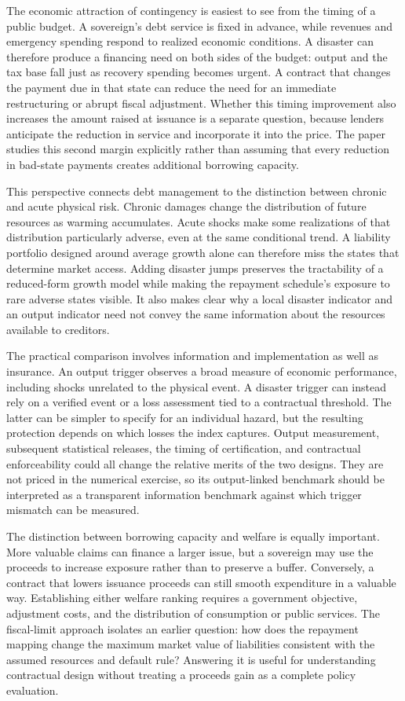 The economic attraction of contingency is easiest to see from the timing of a public budget. A sovereign's debt service is fixed in advance, while revenues and emergency spending respond to realized economic conditions. A disaster can therefore produce a financing need on both sides of the budget: output and the tax base fall just as recovery spending becomes urgent. A contract that changes the payment due in that state can reduce the need for an immediate restructuring or abrupt fiscal adjustment. Whether this timing improvement also increases the amount raised at issuance is a separate question, because lenders anticipate the reduction in service and incorporate it into the price. The paper studies this second margin explicitly rather than assuming that every reduction in bad-state payments creates additional borrowing capacity.

This perspective connects debt management to the distinction between chronic and acute physical risk. Chronic damages change the distribution of future resources as warming accumulates. Acute shocks make some realizations of that distribution particularly adverse, even at the same conditional trend. A liability portfolio designed around average growth alone can therefore miss the states that determine market access. Adding disaster jumps preserves the tractability of a reduced-form growth model while making the repayment schedule's exposure to rare adverse states visible. It also makes clear why a local disaster indicator and an output indicator need not convey the same information about the resources available to creditors.

The practical comparison involves information and implementation as well as insurance. An output trigger observes a broad measure of economic performance, including shocks unrelated to the physical event. A disaster trigger can instead rely on a verified event or a loss assessment tied to a contractual threshold. The latter can be simpler to specify for an individual hazard, but the resulting protection depends on which losses the index captures. Output measurement, subsequent statistical releases, the timing of certification, and contractual enforceability could all change the relative merits of the two designs. They are not priced in the numerical exercise, so its output-linked benchmark should be interpreted as a transparent information benchmark against which trigger mismatch can be measured.

The distinction between borrowing capacity and welfare is equally important. More valuable claims can finance a larger issue, but a sovereign may use the proceeds to increase exposure rather than to preserve a buffer. Conversely, a contract that lowers issuance proceeds can still smooth expenditure in a valuable way. Establishing either welfare ranking requires a government objective, adjustment costs, and the distribution of consumption or public services. The fiscal-limit approach isolates an earlier question: how does the repayment mapping change the maximum market value of liabilities consistent with the assumed resources and default rule? Answering it is useful for understanding contractual design without treating a proceeds gain as a complete policy evaluation.
